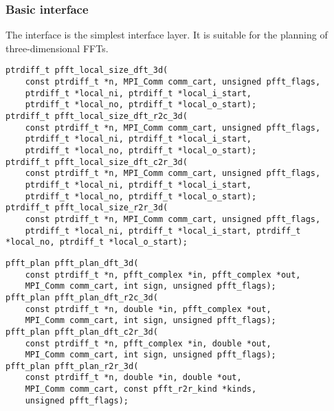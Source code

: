 \subsubsection{Basic interface}
The  interface is the simplest interface layer. It is suitable for the planning of three-dimensional FFTs.
\begin{lstlisting}
ptrdiff_t pfft_local_size_dft_3d(
    const ptrdiff_t *n, MPI_Comm comm_cart, unsigned pfft_flags,
    ptrdiff_t *local_ni, ptrdiff_t *local_i_start,
    ptrdiff_t *local_no, ptrdiff_t *local_o_start);
ptrdiff_t pfft_local_size_dft_r2c_3d(
    const ptrdiff_t *n, MPI_Comm comm_cart, unsigned pfft_flags,
    ptrdiff_t *local_ni, ptrdiff_t *local_i_start,
    ptrdiff_t *local_no, ptrdiff_t *local_o_start);
ptrdiff_t pfft_local_size_dft_c2r_3d(
    const ptrdiff_t *n, MPI_Comm comm_cart, unsigned pfft_flags,
    ptrdiff_t *local_ni, ptrdiff_t *local_i_start,
    ptrdiff_t *local_no, ptrdiff_t *local_o_start);
ptrdiff_t pfft_local_size_r2r_3d(
    const ptrdiff_t *n, MPI_Comm comm_cart, unsigned pfft_flags,
    ptrdiff_t *local_ni, ptrdiff_t *local_i_start, ptrdiff_t *local_no, ptrdiff_t *local_o_start);
\end{lstlisting}
\begin{lstlisting}
pfft_plan pfft_plan_dft_3d(
    const ptrdiff_t *n, pfft_complex *in, pfft_complex *out,
    MPI_Comm comm_cart, int sign, unsigned pfft_flags);
pfft_plan pfft_plan_dft_r2c_3d(
    const ptrdiff_t *n, double *in, pfft_complex *out,
    MPI_Comm comm_cart, int sign, unsigned pfft_flags);
pfft_plan pfft_plan_dft_c2r_3d(
    const ptrdiff_t *n, pfft_complex *in, double *out,
    MPI_Comm comm_cart, int sign, unsigned pfft_flags);
pfft_plan pfft_plan_r2r_3d(
    const ptrdiff_t *n, double *in, double *out,
    MPI_Comm comm_cart, const pfft_r2r_kind *kinds,
    unsigned pfft_flags);
\end{lstlisting}

